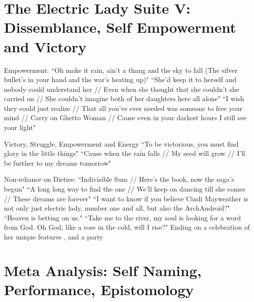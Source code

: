 \documentclass[a4paper, 11pt]{article} %
\begin{document}

\section*{The Electric Lady Suite V: Dissemblance, Self Empowerment and Victory}

Empowerment: 
``Oh make it rain, ain't a thang and the sky to fall (The silver bullet's in your hand and the war's heating up)" \cite{manymoons}
``She'd keep it to herself and nobody could understand her // Even when she thought that she couldn't she carried on // She couldn't imagine both of her daughters here all alone"\cite{ghettowoman}
``I wish they could just realize // That all you've ever needed was someone to free your mind // Carry on Ghetto Woman // Cause even in your darkest hours I still see your light" \cite{ghettowoman}

Victory, Struggle, Empowerment and Energy
``To be victorious, you must find glory in the little things"\cite{victory}
``Cause when the rain falls // My seed will grow // I'll be further to my dreams tomorrow"\cite{victory}


Non-reliance on Dieties:
``Indivisible Sum // Here's the book, now the saga's begun"\cite{fiveseveneighttwoone}
``A long long way to find the one // We'll keep on dancing till she comes // These dreams are forever"\cite{danceordie}
``I want to know if you believe Cindi Mayweather is not only just electric lady, number one and all, but also the ArchAndroid?"\cite{favoritefugitive}
``Heaven is betting on us."\cite{primetime}
``Take me to the river, my soul is looking for a word from God. Oh God, like a rose in the cold, will I rise?"\cite{sallyride}
Ending on a celebration of her unique features \cite{dorothydandridgeeyes}, and a party\cite{whatanexperience}


\section*{Meta Analysis: Self Naming, Performance, Epistomology}
\end{document}
